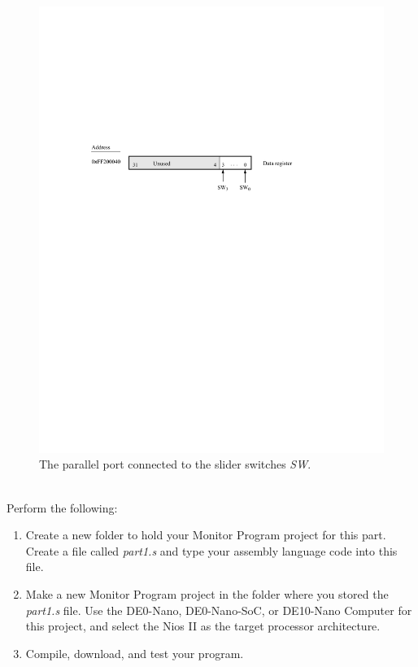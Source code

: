 \documentclass[epsfig,10pt,fullpage]{article}
\begin{document}
\begin{figure}[H]
	\begin{center}
	\includegraphics[scale=1]{figures/DE0_Nano_SoC/figureSW.pdf}
	\end{center}
	\caption{The parallel port connected to the slider switches {\it SW}.}
\label{fig:SW2}
\end{figure}

~\\
\noindent
Perform the following:

\begin{enumerate}
\item Create a new folder to hold your Monitor Program project for this part. Create a
file called {\it part1.s} and type your assembly language code into this file.

\item
Make a new Monitor Program project in the folder where you stored the {\it part1.s}
file. Use the DE0-Nano, DE0-Nano-SoC, or DE10-Nano Computer for this project, and select 
the Nios II as the target processor architecture.

\item
Compile, download, and test your program. 
\end{enumerate}
\end{document}
